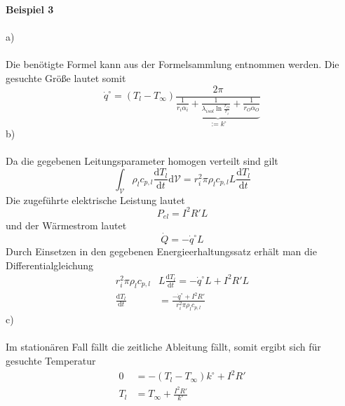 \newpage
\noindent
\textbf{Beispiel 3}\\ \\
a)\\ \\
Die benötigte Formel kann aus der Formelsammlung entnommen werden. Die gesuchte Größe lautet somit
\[
	\dot{q}^\circ = (T_l - T_\infty)\frac{2\pi}{\underbrace{\frac{1}{r_i\alpha_i} + \frac{1}{\lambda_{isol} \ln\frac{r_O}{r_i}} + \frac{1}{r_O\alpha_O}}_{:= k^\circ}}
\]
b)\\ \\
Da die gegebenen Leitungsparameter homogen verteilt sind gilt 
\[
	\int_{\mathcal{V}}\rho_lc_{p,l}\frac{\text{d}T_l}{\text{d}t}\text{d}\mathcal{V} = r_i^2\pi\rho_lc_{p,l}L\frac{\text{d}T_l}{\text{d}t}
\]
Die zugeführte elektrische Leistung lautet
\[
	P_{el} = I^2R'L
\]
und der Wärmestrom lautet
\[
	\dot{Q} = -\dot{q}^\circ L
\]
Durch Einsetzen in den gegebenen Energieerhaltungssatz erhält man die Differentialgleichung
\begin{align*}
	r_i^2\pi\rho_lc_{p,l}&L\frac{\text{d}T_l}{\text{d}t} = -\dot{q}^\circ L + I^2R'L \\
	\frac{\text{d}T_l}{\text{d}t} &= \frac{-\dot{q}^\circ + I^2R'}{r_i^2\pi\rho_lc_{p,l}}
\end{align*}
c)\\ \\
Im stationären Fall fällt die zeitliche Ableitung fällt, somit ergibt sich für gesuchte Temperatur
\begin{align*}
	0 &= -(T_l - T_\infty)k^\circ + I^2R' \\
	T_l &= T_\infty + \frac{I^2R'}{k^\circ}
\end{align*}